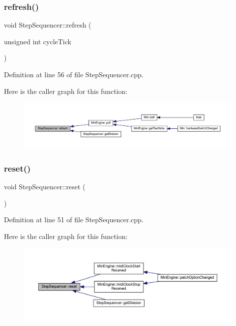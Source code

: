 \subsubsection{\texorpdfstring{refresh()}{refresh()}}
{\footnotesize\ttfamily void Step\+Sequencer\+::refresh (\begin{DoxyParamCaption}\item[{unsigned int}]{cycle\+Tick }\end{DoxyParamCaption})}



Definition at line 56 of file Step\+Sequencer.\+cpp.

Here is the caller graph for this function\+:
\nopagebreak
\begin{figure}[H]
\begin{center}
\leavevmode
\includegraphics[width=350pt]{class_step_sequencer_a706e6a91c6b3ccd606876f57c334b311_icgraph}
\end{center}
\end{figure}
\mbox{\label{class_step_sequencer_afc3d99a316fa16322c1a582a49e8f272}} 
\subsubsection{\texorpdfstring{reset()}{reset()}}
{\footnotesize\ttfamily void Step\+Sequencer\+::reset (\begin{DoxyParamCaption}{ }\end{DoxyParamCaption})}



Definition at line 51 of file Step\+Sequencer.\+cpp.

Here is the caller graph for this function\+:
\nopagebreak
\begin{figure}[H]
\begin{center}
\leavevmode
\includegraphics[width=350pt]{class_step_sequencer_afc3d99a316fa16322c1a582a49e8f272_icgraph}
\end{center}
\end{figure}
\mbox{\label{class_step_sequencer_a5d62b641961ca9eaef9273efb9ed38b0}} 
